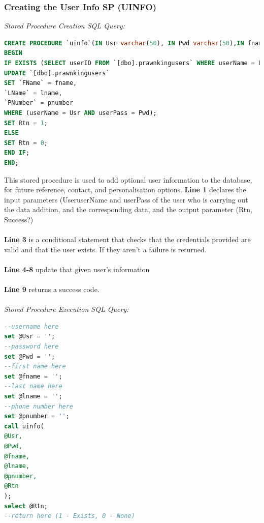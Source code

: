 \documentclass[a4paper,11pt]{proc}
\begin{document}
\subsubsection{Creating the User Info SP (UINFO)}
\textit{Stored Procedure Creation SQL Query:}
\begin{lstlisting}[language=SQL,
deletekeywords={IDENTITY,INT},
morekeywords={clustered,OUT, BEGIN, PROCEDURE},    
framesep=10pt,
framextopmargin=10pt]
CREATE PROCEDURE `uinfo`(IN Usr varchar(50), IN Pwd varchar(50),IN fname varchar(50), IN lname varchar(50), IN pnumber varchar(50), OUT Rtn bit)
BEGIN
IF EXISTS (SELECT userID FROM `[dbo].prawnkingusers` WHERE userName = Usr AND userPass = Pwd) THEN
UPDATE `[dbo].prawnkingusers`
SET `FName` = fname,
`LName` = lname,
`PNumber` = pnumber
WHERE (userName = Usr AND userPass = Pwd);
SET Rtn = 1;
ELSE
SET Rtn = 0;
END IF;
END;
\end{lstlisting}
This stored procedure is used to add optional user information to the database, for future reference, contact, and personalisation options. \textbf{Line 1} declares the input parameters (UseruserName and userPass of the user who is carrying out the data addition, and the corresponding data, and the output parameter (Rtn, Success?)\\
\\\textbf{Line 3} is  a conditional statement that checks that the credentials provided are valid and that the user exists. If they aren't a failure is returned.\\
\\\textbf{Line 4-8} update that given user's information \\
\\\textbf{Line 9} returns a success code.\\
\\\textit{Stored Procedure Execution SQL Query:}
\begin{lstlisting}[language=SQL,
deletekeywords={IDENTITY,INT},
morekeywords={clustered,OUT, BEGIN, PROCEDURE,CALL},    
framesep=10pt,
framextopmargin=10pt]
--username here
set @Usr = '';
--password here
set @Pwd = '';
--first name here
set @fname = '';
--last name here
set @lname = '';
--phone number here
set @pnumber = '';
call uinfo(
@Usr,
@Pwd,
@fname,
@lname,
@pnumber,
@Rtn
);
select @Rtn;
--return here (1 - Exists, 0 - None)
\end{lstlisting}
\end{document}
